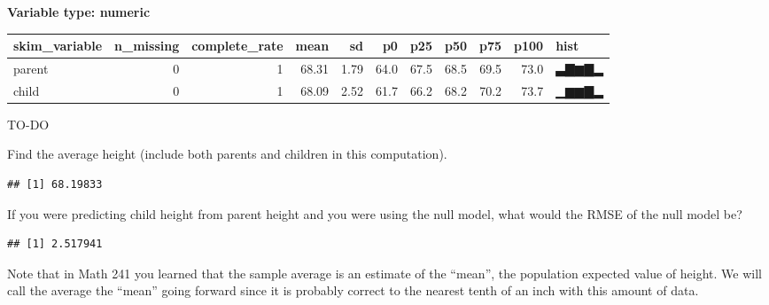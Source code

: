 \documentclass[
]{article}
\newenvironment{Shaded}{\begin{snugshade}}{\end{snugshade}}
\newcommand{\DecValTok}[1]{\textcolor[rgb]{0.00,0.00,0.81}{#1}}
\newcommand{\FunctionTok}[1]{\textcolor[rgb]{0.00,0.00,0.00}{#1}}
\newcommand{\NormalTok}[1]{#1}
\newcommand{\OtherTok}[1]{\textcolor[rgb]{0.56,0.35,0.01}{#1}}
\newcommand{\SpecialCharTok}[1]{\textcolor[rgb]{0.00,0.00,0.00}{#1}}
\begin{document}
\textbf{Variable type: numeric}

\begin{longtable}[]{@{}lrrrrrrrrrl@{}}
\toprule
skim\_variable & n\_missing & complete\_rate & mean & sd & p0 & p25 &
p50 & p75 & p100 & hist \\
\midrule
\endhead
parent & 0 & 1 & 68.31 & 1.79 & 64.0 & 67.5 & 68.5 & 69.5 & 73.0 &
▃▇▆▇▂ \\
child & 0 & 1 & 68.09 & 2.52 & 61.7 & 66.2 & 68.2 & 70.2 & 73.7 &
▁▆▆▇▂ \\
\bottomrule
\end{longtable}

TO-DO

Find the average height (include both parents and children in this
computation).

\begin{Shaded}
\end{Shaded}

\begin{verbatim}
## [1] 68.19833
\end{verbatim}

If you were predicting child height from parent height and you were
using the null model, what would the RMSE of the null model be?

\begin{Shaded}
\end{Shaded}

\begin{verbatim}
## [1] 2.517941
\end{verbatim}

Note that in Math 241 you learned that the sample average is an estimate
of the ``mean'', the population expected value of height. We will call
the average the ``mean'' going forward since it is probably correct to
the nearest tenth of an inch with this amount of data.
\end{document}
